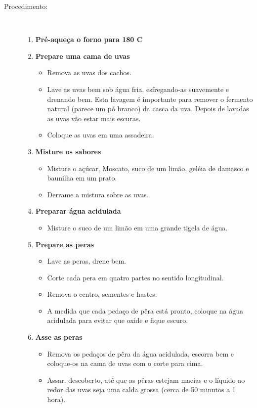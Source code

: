 \documentclass [11pt, letterpaper] {article}
\begin{document}
\begin {description}
\item [Procedimento:] \ \\
\begin {enumerate}
\item {\bf Pré-aqueça o forno para 180 C}
\item {\bf Prepare uma cama de uvas}
\begin {itemize}
\item Remova as uvas dos cachos.
        \item Lave as uvas bem sob água fria, esfregando-as suavemente e drenando bem. Esta lavagem \'e importante para remover o fermento natural (parece um p\'o branco) da casca da uva. Depois de lavadas as uvas v\~ao estar mais escuras.
\item Coloque as uvas em uma assadeira.
\end {itemize}
\item {\bf Misture os sabores}
\begin {itemize}
\item Misture o açúcar, Moscato, suco de um limão, geléia de damasco e baunilha em um prato.
\item Derrame a mistura sobre as uvas.
\end {itemize}
\item {\bf Preparar água acidulada}
\begin {itemize}
\item Misture o suco de um limão em uma grande tigela de água.
\end {itemize}
\item {\bf Prepare as peras}
\begin {itemize}
\item Lave as peras, drene bem.
\item Corte cada pera em quatro partes no sentido longitudinal.
\item Remova o centro, sementes e hastes.
\item A medida que cada peda\c{c}o de p\^era est\'a pronto, coloque  na água acidulada para evitar que oxide e fique escuro.
\end {itemize}
\item {\bf Asse as peras}
\begin {itemize}
\item Remova os peda\c{c}os de p\^era da água acidulada, escorra bem e coloque-os na cama de uvas com o  corte para cima.
\item Assar, descoberto, até que as p\^eras estejam macias e o líquido ao redor das uvas seja uma calda grossa (cerca de 50 minutos a 1 hora).

\end{itemize}
\end{enumerate}
\end{description}
\end{document}
